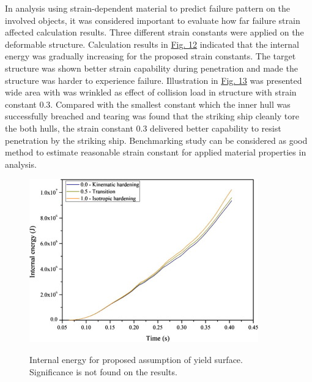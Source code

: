 \documentclass[../Final.tex]{subfiles}
\begin{document}
In analysis using strain-dependent material to predict failure pattern on the involved objects, it was considered important to evaluate how far failure strain affected calculation results. 
Three different strain constants were applied on the deformable structure. 
Calculation results in \hyperref[fig12]{Fig. 12} indicated that the internal energy was gradually increasing for the proposed strain constants. 
The target structure was shown better strain capability during penetration and made the structure was harder to experience failure. Illustration in \hyperref[fig13]{Fig. 13} was presented wide area with was wrinkled as effect 
of collision load in structure with strain constant 0.3. Compared with the smallest constant which the inner hull was successfully breached and tearing was found that the striking ship cleanly tore the both hulls, 
the strain constant 0.3 delivered better capability to resist penetration by the striking ship. 
Benchmarking study can be considered as good method to estimate reasonable strain constant for applied material properties in analysis. 

\begin{figure}[ht]
    \centering
    \includegraphics[width=\columnwidth]{fig14.jpg}
    \label{fig14}
    \caption{Internal energy for proposed assumption of yield surface. Significance is not found on the results.}
\end{figure}
\end{document}
